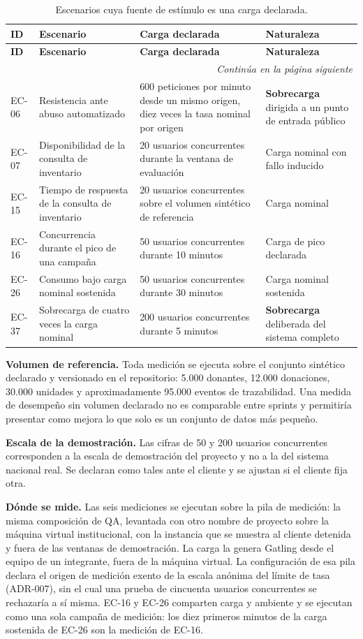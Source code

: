 \documentclass[11pt,a4paper]{article}
\newcommand{\contlinea}[1]{\multicolumn{#1}{r}{\footnotesize\itshape Continúa en la página siguiente}}
\begin{document}
\begin{longtable}{L{1.4cm} L{4.2cm} L{4.2cm} L{4.6cm}}
\caption{Escenarios cuya fuente de estímulo es una carga declarada.}\label{tab:carga}\\
\toprule
\textbf{ID} & \textbf{Escenario} & \textbf{Carga declarada} & \textbf{Naturaleza} \\
\midrule
\endfirsthead
\toprule
\textbf{ID} & \textbf{Escenario} & \textbf{Carga declarada} & \textbf{Naturaleza} \\
\midrule
\endhead
\midrule
\contlinea{4} \\
\endfoot
\bottomrule
\endlastfoot
EC-06 & Resistencia ante abuso automatizado & 600 peticiones por minuto desde un mismo origen, diez veces la tasa nominal por origen & \textbf{Sobrecarga} dirigida a un punto de entrada público \\
EC-07 & Disponibilidad de la consulta de inventario & 20 usuarios concurrentes durante la ventana de evaluación & Carga nominal con fallo inducido \\
EC-15 & Tiempo de respuesta de la consulta de inventario & 20 usuarios concurrentes sobre el volumen sintético de referencia & Carga nominal \\
EC-16 & Concurrencia durante el pico de una campaña & 50 usuarios concurrentes durante 10 minutos & Carga de pico declarada \\
EC-26 & Consumo bajo carga nominal sostenida & 50 usuarios concurrentes durante 30 minutos & Carga nominal sostenida \\
EC-37 & Sobrecarga de cuatro veces la carga nominal & 200 usuarios concurrentes durante 5 minutos & \textbf{Sobrecarga} deliberada del sistema completo \\
\end{longtable}

\noindent\textbf{Volumen de referencia.} Toda medición se ejecuta sobre el conjunto sintético declarado y versionado en el repositorio: 5.000 donantes, 12.000 donaciones, 30.000 unidades y aproximadamente 95.000 eventos de trazabilidad. Una medida de desempeño sin volumen declarado no es comparable entre sprints y permitiría presentar como mejora lo que solo es un conjunto de datos más pequeño.

\textbf{Escala de la demostración.} Las cifras de 50 y 200 usuarios concurrentes corresponden a la escala de demostración del proyecto y no a la del sistema nacional real. Se declaran como tales ante el cliente y se ajustan si el cliente fija otra.

\textbf{Dónde se mide.} Las seis mediciones se ejecutan sobre la pila de medición: la misma composición de QA, levantada con otro nombre de proyecto sobre la máquina virtual institucional, con la instancia que se muestra al cliente detenida y fuera de las ventanas de demostración. La carga la genera Gatling desde el equipo de un integrante, fuera de la máquina virtual. La configuración de esa pila declara el origen de medición exento de la escala anónima del límite de tasa (ADR-007), sin el cual una prueba de cincuenta usuarios concurrentes se rechazaría a sí misma. EC-16 y EC-26 comparten carga y ambiente y se ejecutan como una sola campaña de medición: los diez primeros minutos de la carga sostenida de EC-26 son la medición de EC-16.
\end{document}

